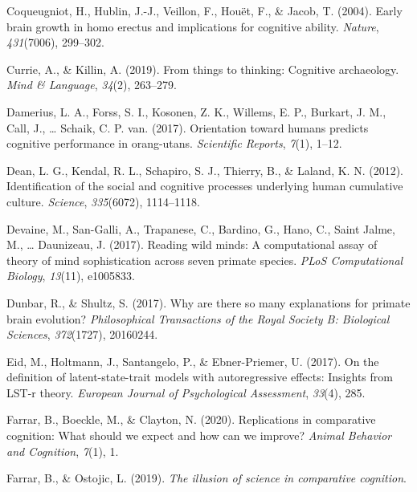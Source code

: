 \documentclass[
  man,floatsintext]{apa6}
\newlength{\cslhangindent}
\newlength{\cslentryspacingunit} %
\newenvironment{CSLReferences}[2] %
 {%
  \setlength{\parindent}{0pt}
  \ifodd #1
  \let\oldpar\par
  \def\par{\hangindent=\cslhangindent\oldpar}
  \fi
  \setlength{\parskip}{#2\cslentryspacingunit}
 }%
 {}
\begin{document}
\begin{CSLReferences}{1}{0}
\leavevmode{}%
Coqueugniot, H., Hublin, J.-J., Veillon, F., Houët, F., \& Jacob, T. (2004). Early brain growth in homo erectus and implications for cognitive ability. \emph{Nature}, \emph{431}(7006), 299--302.

\leavevmode{}%
Currie, A., \& Killin, A. (2019). From things to thinking: Cognitive archaeology. \emph{Mind \& Language}, \emph{34}(2), 263--279.

\leavevmode{}%
Damerius, L. A., Forss, S. I., Kosonen, Z. K., Willems, E. P., Burkart, J. M., Call, J., \ldots{} Schaik, C. P. van. (2017). Orientation toward humans predicts cognitive performance in orang-utans. \emph{Scientific Reports}, \emph{7}(1), 1--12.

\leavevmode{}%
Dean, L. G., Kendal, R. L., Schapiro, S. J., Thierry, B., \& Laland, K. N. (2012). Identification of the social and cognitive processes underlying human cumulative culture. \emph{Science}, \emph{335}(6072), 1114--1118.

\leavevmode{}%
Devaine, M., San-Galli, A., Trapanese, C., Bardino, G., Hano, C., Saint Jalme, M., \ldots{} Daunizeau, J. (2017). Reading wild minds: A computational assay of theory of mind sophistication across seven primate species. \emph{PLoS Computational Biology}, \emph{13}(11), e1005833.

\leavevmode{}%
Dunbar, R., \& Shultz, S. (2017). Why are there so many explanations for primate brain evolution? \emph{Philosophical Transactions of the Royal Society B: Biological Sciences}, \emph{372}(1727), 20160244.

\leavevmode{}%
Eid, M., Holtmann, J., Santangelo, P., \& Ebner-Priemer, U. (2017). On the definition of latent-state-trait models with autoregressive effects: Insights from LST-r theory. \emph{European Journal of Psychological Assessment}, \emph{33}(4), 285.

\leavevmode{}%
Farrar, B., Boeckle, M., \& Clayton, N. (2020). Replications in comparative cognition: What should we expect and how can we improve? \emph{Animal Behavior and Cognition}, \emph{7}(1), 1.

\leavevmode{}%
Farrar, B., \& Ostojic, L. (2019). \emph{The illusion of science in comparative cognition}.


\end{CSLReferences}
\end{document}
